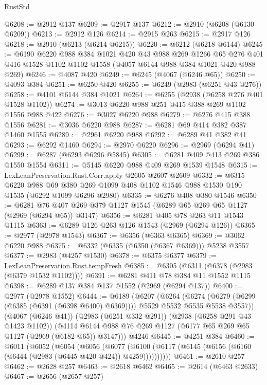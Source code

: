\begin{lexlean}{RustStd}
\begin{coremodule}
@6208 := @2912 @137
@6209 := @2917 @137
@6212 := @2910 (@6208 (@6130 @6209))
@6213 := @2912 @126
@6214 := @2915 @263
@6215 := @2917 @126
@6218 := @2910 (@6213 (@6214 @6215))
@6220 := @6212 (@6218 @6144)
@6245 := @6190
    @6220
    @988
    @384
    @1021
    @420
    @43
    @988
    @269
    @1266
    @65
    @276
    @401
    @416
    @1528
    @1102
    @1102
    @1558
    (@4057 @6144 @988 @384 @1021 @420 @988 @269)
@6246 := @4087 @420
@6249 := @6245 (@4067 (@6246 @65))
@6250 := @4093 @384
@6251 := @6250 @420
@6255 := @6249 (@2983 (@6251 @43 @276))
@6258 := @4101 @6144 @384 @1021
@6264 := @6255 (@2938 (@6258 @276 @401 @1528 @1102))
@6274 := @3013 @6220 @988 @251 @415 @388 @269 @1102 @1556 @988 @422
@6276 := @3027 @6220 @988
@6279 := @6276 @415 @388 @1556
@6281 := @3036 @6220 @988
@6287 := @6281 @69 @414 @382 @387 @1460 @1555
@6289 := @2961 @6220 @988
@6292 := @6289 @41 @382 @41
@6293 := @6292 @1460
@6294 := @2970 @6220
@6296 := @2969 (@6294 @41)
@6299 := @6287 (@6293 @6296 @5845)
@6305 := @6281 @409 @413 @269 @386 @1550 @1554
@6311 := @5145 @6220 @988 @409 @269 @1539 @1548
@6315 := LexLeanPreservation.Rust.Corr.apply @2605 @2607 @2609
@6332 := @6315
    @6220
    @988
    @69
    @380
    @269
    @1099
    @408
    @1102
    @1546
    @988
    @1530
    @190
    @1535
    (@6292 @1099 @6296 @2980)
@6335 := @6276 @408 @380 @1546
@6350 := @6281 @76 @407 @269 @379 @1127 @1545 (@6289 @65 @269 @65 @1127 (@2969 (@6294 @65)) @3147)
@6356 := @6281 @405 @78 @263 @11 @1543 @1115
@6363 := @6289 @126 @263 @126 @1543 (@2969 (@6294 @126))
@6365 := @2977 (@2978 @1543)
@6367 := @6356 (@6363 @6365)
@6369 := @3062 @6220 @988
@6375 := @6332 (@6335 (@6350 (@6367 @6369))) @5238 @3557
@6377 := @2983 (@4257 @1530)
@6378 := @6375 @6377
@6379 := LexLeanPreservation.Rust.tempFresh
@6385 := @6305 (@6311 (@6378 (@2983 (@6379 @1532 @1102))))
@6391 := @6281 @411 @78 @384 @11 @1552 @1115
@6398 := @6289 @137 @384 @137 @1552 (@2969 (@6294 @137))
@6400 := @2977 (@2978 @1552)
@6444 := @6189
    (@6207
      (@6264
        (@6274 (@6279 (@6299 (@6385 (@6391 (@6398 @6400) @6369)))) @5529 @5532 @5535 @5538 @3557))
      (@4067 (@6246 @41))
      (@2983 (@6251 @332 @291))
      (@2938 (@6258 @291 @43 @1423 @1102))
      (@4114 @6144 @988 @76 @269 @1127 (@6177 @65 @269 @65 @1127 (@2969 (@6182 @65)) @3147)))
    @4246
@6445 := @4251 @384
@6460 := @6011
    (@6052
      (@6054
        (@6056
          (@6077 (@6100 (@6117 (@6145 (@6156 (@6160 (@6444 (@2983 (@6445 @420 @424)) @4259))))))))))
@6461 := @2610 @257
@6462 := @2628 @257
@6463 := @2618 @6462
@6465 := @2614 (@6463 @2633)
@6467 := @2656 (@2657 @257)

\end{coremodule}
\end{lexlean}
